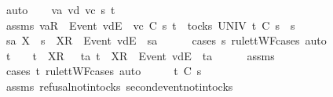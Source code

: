 \begin{isabellebody}
\ auto\isanewline
{}\isamarkupfalse%
\isanewline
\ \ \isamarkupfalse%
\ va\ vd\ vc\ s{}{\isacharprime}\ t\isanewline
\ \ \isamarkupfalse%
\ assms{\isacharcolon}\ {\isachardoublequoteopen}{\isacharbrackleft}va{\isacharbrackright}\isactrlsub R\ {\isacharhash}\ {\isacharbrackleft}Event\ vd{\isacharbrackright}\isactrlsub E\ {\isacharhash}\ vc\ {\isasymsubseteq}\isactrlsub C\ s{}{\isacharprime}{\isachardoublequoteclose}\ {\isachardoublequoteopen}t\ {\isasymin}\ tocks\ UNIV{\isachardoublequoteclose}\ {\isachardoublequoteopen}t\ {\isasymle}\isactrlsub C\ s{}{\isacharprime}\ {\isacharat}\ s{}{\isachardoublequoteclose}\isanewline
\ \ \isamarkupfalse%
\ \isamarkupfalse%
\ s{}{\isacharprime}a\ X\ \ {\isachardoublequoteopen}s{}{\isacharprime}\ {\isacharequal}\ {\isacharbrackleft}X{\isacharbrackright}\isactrlsub R\ {\isacharhash}\ {\isacharbrackleft}Event\ vd{\isacharbrackright}\isactrlsub E\ {\isacharhash}\ s{}{\isacharprime}a{\isachardoublequoteclose}\isanewline
\ \ \ \ \isamarkupfalse%
\ {\isacharparenleft}cases\ s{}{\isacharprime}\ rule{\isacharcolon}ttWF{\isachardot}cases{\isacharcomma}\ auto{\isacharparenright}\isanewline
\ \ \isamarkupfalse%
\ \isamarkupfalse%
\ {\isachardoublequoteopen}t\ {\isacharequal}\ {\isacharbrackleft}{\isacharbrackright}\ {\isasymor}\ t\ {\isacharequal}\ {\isacharbrackleft}{\isacharbrackleft}X{\isacharbrackright}\isactrlsub R{\isacharbrackright}\ {\isasymor}\ {\isacharparenleft}{\isasymexists}\ ta{\isachardot}\ t\ {\isacharequal}\ {\isacharbrackleft}X{\isacharbrackright}\isactrlsub R\ {\isacharhash}\ {\isacharbrackleft}Event\ vd{\isacharbrackright}\isactrlsub E\ {\isacharhash}\ ta{\isacharparenright}{\isachardoublequoteclose}\isanewline
\ \ \ \ \isamarkupfalse%
\ assms{\isacharparenleft}{}{\isacharparenright}\ \isamarkupfalse%
\ {\isacharparenleft}cases\ t\ rule{\isacharcolon}ttWF{\isachardot}cases{\isacharcomma}\ auto{\isacharparenright}\isanewline
\ \ \isamarkupfalse%
\ \isamarkupfalse%
\ {\isachardoublequoteopen}t\ {\isasymle}\isactrlsub C\ s{}{\isacharprime}{\isachardoublequoteclose}\isanewline
\ \ \ \ \isamarkupfalse%
\ assms{\isacharparenleft}{}{\isacharparenright}\ refusal{\isacharunderscore}notin{\isacharunderscore}tocks\ second{\isacharunderscore}event{\isacharunderscore}notin{\isacharunderscore}tocks\ \isamarkupfalse%

\end{isabellebody}

